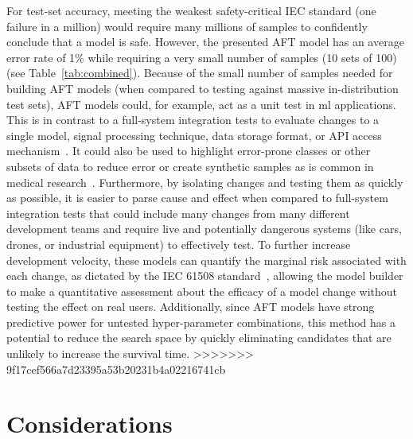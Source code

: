 \documentclass[sn-mathphys-num]{sn-jnl}%
\begin{document}
For test-set accuracy,  meeting the weakest safety-critical IEC standard (one failure in a million) would require many millions of samples to confidently conclude that a model is safe. However, the presented AFT model has an average error rate of 1\% while requiring a very small number of samples (10 sets of 100) (see Table~\ref{tab:combined}). 
Because of the small number of samples needed for building AFT models (when compared to testing against massive in-distribution test sets), AFT models could, for example, act as a unit test in \acrshort{ml} applications. 
This is in contrast to a full-system integration tests to evaluate changes to a single model, signal processing technique, data storage format, or API access mechanism~\cite{schmoor2000sample,lachin1981introduction}. 
It could also be used to highlight error-prone classes or other subsets of data to reduce error or create synthetic samples as is common in medical research~\cite{kleinbaum1996survival}. 
Furthermore, by isolating changes and testing them as quickly as possible, it is easier to parse cause and effect when compared to full-system integration tests that could include many changes from many different development teams and require live and potentially dangerous systems (like cars, drones, or industrial equipment) to effectively test. 
To further increase development velocity, these models can quantify the marginal risk associated with each change, as dictated by the IEC 61508 standard~\cite{IEC61508}, allowing the model builder to make a quantitative assessment about the efficacy of a model change without testing the effect on real users. 
Additionally, since AFT models have strong predictive power for untested hyper-parameter combinations, this method has a potential to reduce the search space by quickly eliminating candidates that are unlikely to increase the survival time. 
>>>>>>> 9f17cef566a7d23395a53b20231b4a02216741cb

\section{Considerations}
\label{considerations}
\end{document}
